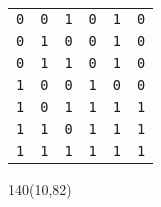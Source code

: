 \documentclass[aspectratio=169]{beamer}
\begin{document}
\begin{frame}[fragile,t]
\begin{textblock}{80}
{\begin{center}
\begin{tabular}{ccc||c|c||c}
     \texttt{0} & \texttt{0} & \texttt{1} & \texttt{0} &\texttt{1} & \texttt{0} \\
     \texttt{0} & \texttt{1} & \texttt{0} & \texttt{0} &\texttt{1} & \texttt{0} \\
     \texttt{0} & \texttt{1} & \texttt{1} & \texttt{0} &\texttt{1} & \texttt{0} \\
     \texttt{1} & \texttt{0} & \texttt{0} & \texttt{1} &\texttt{0} & \texttt{0} \\
     \texttt{1} & \texttt{0} & \texttt{1} & \texttt{1} &\texttt{1} & \texttt{1} \\
     \texttt{1} & \texttt{1} & \texttt{0} & \texttt{1} &\texttt{1} & \texttt{1} \\
     \texttt{1} & \texttt{1} & \texttt{1} & \texttt{1} &\texttt{1} & \texttt{1} \\
    \end{tabular}
    \end{center}
    } \end{textblock}
    \begin{textblock}{140}(10,82)   \end{textblock}
\end{frame}
\end{document}
